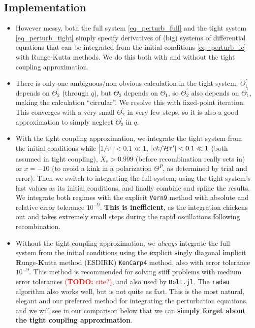 \documentclass[10pt,a4paper]{article}
\newcommand\TODO[1]{\textcolor{red}{(\textbf{TODO:} #1)}}
\begin{document}
\subsection{Implementation}

\begin{itemize}
\item
However messy,
both the full system \eqref{eq_perturb_full} and the tight system \eqref{eq_perturb_tight} simply specify derivatives of (big) systems of differential equations
that can be integrated from the initial conditions \eqref{eq_perturb_ic} with Runge-Kutta methods.
We do this both with and without the tight coupling approximation.

\item
There is only one ambiguous/non-obvious calculation in the tight system:
$\Theta_1^\prime$ depends on $\Theta_2^\prime$ (through $q$),
but $\Theta_2$ depends on $\Theta_1$,
so $\Theta_2^\prime$ also depends on $\Theta_1^\prime$, making the calculation ``circular''.
We resolve this with fixed-point iteration.
This converges with a very small $\Theta_2^\prime$ in very few steps, so it is also a good approximation to simply neglect $\Theta_2^\prime$ in $q$.

\item
With the tight coupling approximation,
we integrate the tight system from the initial conditions while
$|1/\tau^\prime| < 0.1 \ll 1$,
$|ck/\mathcal{H}\tau^\prime| < 0.1 \ll 1$ (both assumed in tight coupling),
$X_e > 0.999$ (before recombination really sets in)
or $x = -10$ (to avoid a kink in a polarization $\Theta^P$, as determined by trial and error).
Then we switch to integrating the full system, using the tight system's last values as its initial conditions, and finally combine and spline the results.
We integrate both regimes with the explicit \texttt{Vern9} method with absolute and relative error tolerance $10^{-9}$.
\textbf{This is inefficient}, as the integration chickens out and takes extremely small steps during the rapid oscillations following recombination.

\item
Without the tight coupling approximation,
we \textit{always} integrate the full system from the initial conditions using the \textbf{e}xplicit \textbf{s}ingly \textbf{d}iagonal \textbf{i}mplicit \textbf{R}unge-\textbf{K}utta method (ESDIRK) \texttt{KenCarp4} method, also with error tolerance $10^{-9}$.
This method is recommended for solving stiff problems with medium error tolerances \TODO{cite?},
and also used by \texttt{Bolt.jl}.
The \texttt{radau} algorithm also works well, but is not quite as fast.
This is the most natural, elegant and our preferred method for integrating the perturbation equations,
and we will see in our comparison below that we can \textbf{simply forget about the tight coupling approximation}.


\end{itemize}
\end{document}

